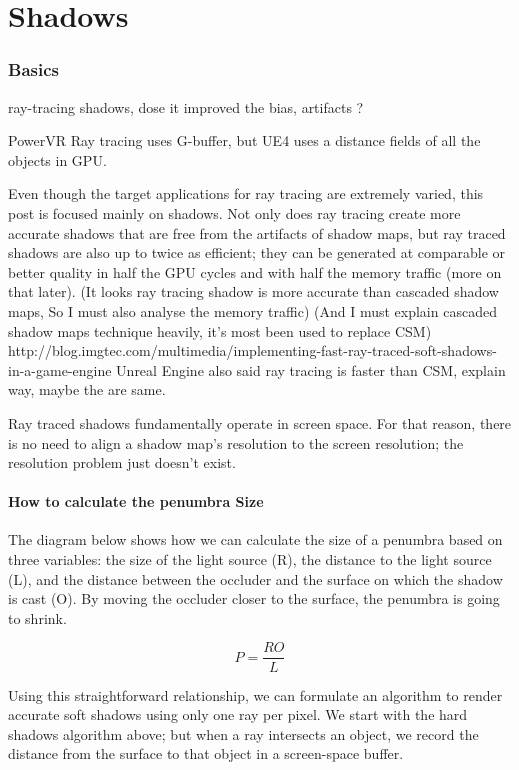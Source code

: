 \chapter{Shadows}

\subsection{Basics}


ray-tracing shadows, dose it improved the bias, artifacts ?


PowerVR Ray tracing uses G-buffer, but UE4 uses a distance fields of all the objects in GPU. 



Even though the target applications for ray tracing are extremely varied, this post is focused mainly on shadows. Not only does ray tracing create more accurate shadows that are free from the artifacts of shadow maps, but ray traced shadows are also up to twice as efficient; they can be generated at comparable or better quality in half the GPU cycles and with half the memory traffic (more on that later).
(It looks ray tracing shadow is more accurate than cascaded shadow maps, So I must also analyse the memory traffic)
(And I must explain cascaded shadow maps technique heavily, it's most been used to replace CSM)
http://blog.imgtec.com/multimedia/implementing-fast-ray-traced-soft-shadows-in-a-game-engine
Unreal Engine also said ray tracing is faster than CSM, explain way, maybe the are same. 


Ray traced shadows fundamentally operate in screen space. For that reason, there is no need to align a shadow map’s resolution to the screen resolution; the resolution problem just doesn’t exist.




\subsubsection{How to calculate the penumbra Size}
The diagram below shows how we can calculate the size of a penumbra based on three variables: the size of the light source (R), the distance to the light source (L), and the distance between the occluder and the surface on which the shadow is cast (O). By moving the occluder closer to the surface, the penumbra is going to shrink.

\begin{equation}
	P=\frac{RO}{L}
\end{equation}

Using this straightforward relationship, we can formulate an algorithm to render accurate soft shadows using only one ray per pixel. We start with the hard shadows algorithm above; but when a ray intersects an object, we record the distance from the surface to that object in a screen-space buffer.

